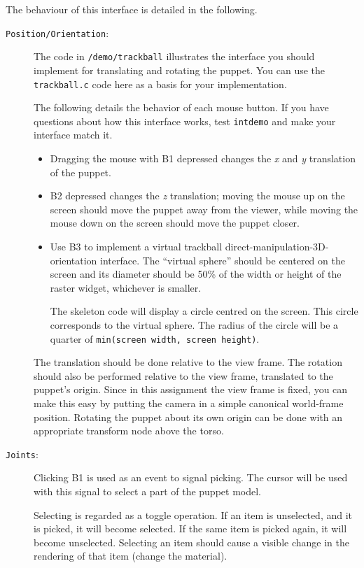 The behaviour of this interface is detailed in the following.
\begin{description}
\item[{\tt Position/Orientation}:]
    The code in \texttt{\CourseData/demo/trackball} illustrates the
    interface you should implement for translating and rotating the
    puppet. You can use the \texttt{trackball.c} code here as a basis
    for your implementation.

    The following details the behavior of each mouse button.
    If you have questions about how this interface works,
    test {\tt intdemo} and make your interface match it.
    \begin{itemize}
	\item Dragging the mouse with B1 depressed changes the {\it x}
	    and {\it y} translation of the puppet. 
	\item B2 depressed changes the {\it z} translation; moving the
	    mouse up on the screen should move the puppet away from
	    the viewer, while moving the mouse down on the screen 
	    should move the puppet closer.
	\item Use B3 to implement a virtual trackball 
	    direct-manipulation-3D-orientation interface.
	    The ``virtual sphere'' should be centered on the screen
	    and its diameter should be 50\% of the width or height
	    of the raster widget, whichever is smaller.

The skeleton
code will display a circle centred on the screen.  This
circle corresponds to the virtual sphere.  The radius of the 
circle will be a quarter of \texttt{min(screen width, screen
height)}.  

	\end{itemize}

	The translation should be done relative to the view frame.
The rotation should also be performed relative to the view frame, 
translated to the puppet's origin.
Since in this assignment the view frame is fixed, you can make this
easy by putting the camera in a simple canonical world-frame position.
Rotating the puppet about its own origin can be done with an appropriate
transform node above the torso.

\item[{\tt Joints}:]
	Clicking B1 is used as an event to signal picking.
	The cursor will be used with this signal to
	select a part of the puppet model.

	Selecting is regarded as a toggle operation.
	If an item is unselected, and it is picked,
        it will become selected.
	If the same item is picked again, it will
	become unselected.
        Selecting an item should cause a visible change in the rendering
        of that item (change the material).


\end{description}
